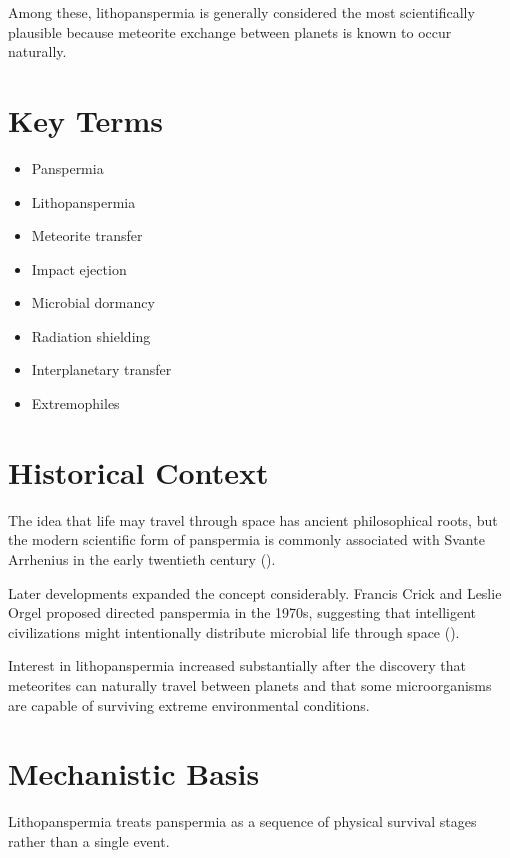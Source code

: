 \documentclass[
  oneside]{book}
\providecommand{\tightlist}{%
  \setlength{\itemsep}{0pt}\setlength{\parskip}{0pt}}
\begin{document}
Among these, lithopanspermia is generally considered the most scientifically plausible because meteorite exchange between planets is known to occur naturally.

\section{Key Terms}\label{key-terms-7}

\begin{itemize}
\tightlist
\item
  Panspermia
\item
  Lithopanspermia
\item
  Meteorite transfer
\item
  Impact ejection
\item
  Microbial dormancy
\item
  Radiation shielding
\item
  Interplanetary transfer
\item
  Extremophiles
\end{itemize}

\section{Historical Context}\label{historical-context-7}

The idea that life may travel through space has ancient philosophical roots, but the modern scientific form of panspermia is commonly associated with Svante Arrhenius in the early twentieth century ().

Later developments expanded the concept considerably. Francis Crick and Leslie Orgel proposed directed panspermia in the 1970s, suggesting that intelligent civilizations might intentionally distribute microbial life through space ().

Interest in lithopanspermia increased substantially after the discovery that meteorites can naturally travel between planets and that some microorganisms are capable of surviving extreme environmental conditions.

\section{Mechanistic Basis}\label{mechanistic-basis-7}

Lithopanspermia treats panspermia as a sequence of physical survival stages rather than a single event.
\end{document}
